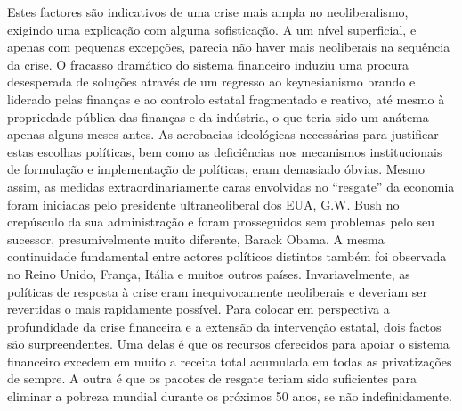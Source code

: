 Estes factores são indicativos de uma crise mais ampla no neoliberalismo, exigindo uma explicação com alguma sofisticação. A um nível superficial, e apenas com pequenas excepções, parecia não haver mais neoliberais na sequência da crise. O fracasso dramático do sistema financeiro induziu uma procura desesperada de soluções através de um regresso ao keynesianismo brando e liderado pelas finanças e ao controlo estatal fragmentado e reativo, até mesmo à propriedade pública das finanças e da indústria, o que teria sido um anátema apenas alguns meses antes. As acrobacias ideológicas necessárias para justificar estas escolhas políticas, bem como as deficiências nos mecanismos institucionais de formulação e implementação de políticas, eram demasiado óbvias. Mesmo assim, as medidas extraordinariamente caras envolvidas no “resgate” da economia foram iniciadas pelo presidente ultraneoliberal dos EUA, G.W. Bush no crepúsculo da sua administração e foram prosseguidos sem problemas pelo seu sucessor, presumivelmente muito diferente, Barack Obama. A mesma continuidade fundamental entre actores políticos distintos também foi observada no Reino Unido, França, Itália e muitos outros países. Invariavelmente, as políticas de resposta à crise eram inequivocamente neoliberais e deveriam ser revertidas o mais rapidamente possível. Para colocar em perspectiva a profundidade da crise financeira e a extensão da intervenção estatal, dois factos são surpreendentes. Uma delas é que os recursos oferecidos para apoiar o sistema financeiro excedem em muito a receita total acumulada em todas as privatizações de sempre. A outra é que os pacotes de resgate teriam sido suficientes para eliminar a pobreza mundial durante os próximos {\color{blue}50} anos, se não indefinidamente.
 \par 

